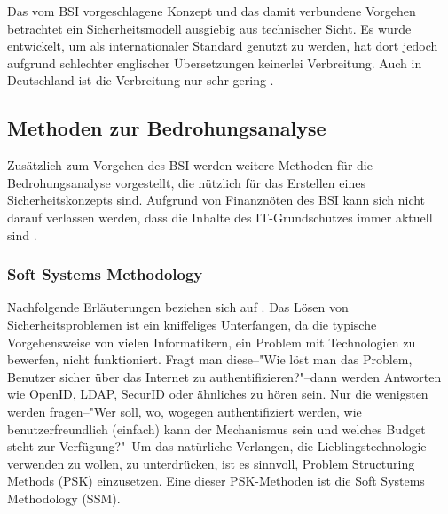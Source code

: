 \documentclass[11pt,a4paper]{report}
\begin{document}
Das vom BSI vorgeschlagene Konzept und das damit verbundene Vorgehen betrachtet ein Sicherheitsmodell ausgiebig aus technischer Sicht. Es wurde entwickelt, um als internationaler Standard genutzt zu werden, hat dort jedoch aufgrund schlechter englischer Übersetzungen keinerlei Verbreitung. Auch in Deutschland ist die Verbreitung nur sehr gering \cite{bsi_kritik}.


\subsection{Methoden zur Bedrohungsanalyse}

Zusätzlich zum Vorgehen des BSI werden weitere Methoden für die Bedrohungsanalyse vorgestellt, die nützlich für das Erstellen eines Sicherheitskonzepts sind. Aufgrund von Finanznöten des BSI kann sich nicht darauf verlassen werden, dass die Inhalte des IT-Grund\-schutzes immer aktuell sind \cite{bsi_not}.

\subsubsection{Soft Systems Methodology} \label{sec:ssm}

Nachfolgende Erläuterungen beziehen sich auf \cite[s.~252]{gutmann}. 
Das Lösen von Sicherheitsproblemen ist ein kniffeliges Unterfangen, da die typische Vorgehensweise von vielen Informatikern, ein Problem mit Technologien zu bewerfen, nicht funktioniert. Fragt man diese--"Wie löst man das Problem, Benutzer sicher über das Internet zu authentifizieren?"--dann werden Antworten wie OpenID, LDAP, SecurID oder ähnliches zu hören sein. Nur die wenigsten werden fragen--"Wer soll, wo, wogegen authentifiziert werden, wie benutzerfreundlich (einfach) kann der Mechanismus sein und welches Budget steht zur Verfügung?"--Um das natürliche Verlangen, die Lieblingstechnologie verwenden zu wollen, zu unterdrücken, ist es sinnvoll, Problem Structuring Methods (PSK) einzusetzen. Eine dieser PSK-Methoden ist die Soft Systems Methodology (SSM).
\end{document}

